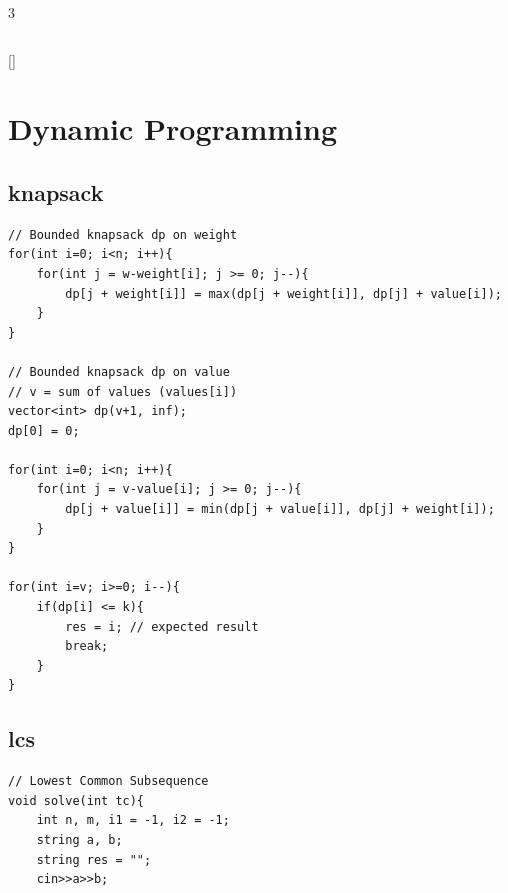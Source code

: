 \documentclass[twoside]{article}
\begin{document}
\begin{multicols*}{3}
\begin{verbatim}
\end{verbatim}

{
[\vspace{2em}]
\section*{Dynamic Programming}
}
{
\subsection*{knapsack}
}
\begin{verbatim}
// Bounded knapsack dp on weight
for(int i=0; i<n; i++){
    for(int j = w-weight[i]; j >= 0; j--){
        dp[j + weight[i]] = max(dp[j + weight[i]], dp[j] + value[i]);
    }
}

// Bounded knapsack dp on value
// v = sum of values (values[i])
vector<int> dp(v+1, inf);
dp[0] = 0;

for(int i=0; i<n; i++){
    for(int j = v-value[i]; j >= 0; j--){
        dp[j + value[i]] = min(dp[j + value[i]], dp[j] + weight[i]);
    }
}

for(int i=v; i>=0; i--){
    if(dp[i] <= k){
        res = i; // expected result
        break;
    }
}
\end{verbatim}

{
\subsection*{lcs}
}
\begin{verbatim}
// Lowest Common Subsequence
void solve(int tc){
    int n, m, i1 = -1, i2 = -1;
    string a, b;
    string res = "";
    cin>>a>>b;


\end{verbatim}
\end{multicols*}
\end{document}
